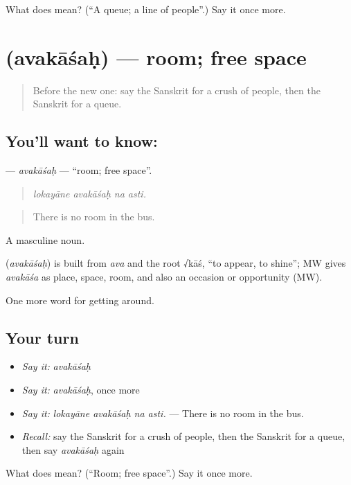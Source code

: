 \begin{tcolorbox}[breakable,colback=teal!4,colframe=teal!35!black,title={Before you move on}]
What does  mean? (\textquotedblleft{}A queue; a line of people\textquotedblright{}.) Say it once more.
\end{tcolorbox}
\section[\texorpdfstring{\sk{अवकाशः} (avakāśaḥ)}{अवकाशः (avakāśaḥ)}]{ (avakāśaḥ) — room; free space}

\label{lesson:SA-C406-avakasah}



\begin{quote}
Before the new one: say the Sanskrit for a crush of people, then the Sanskrit for a queue.
\end{quote}

\subsection*{You'll want to know: }
\textbf{} — \emph{avakāśaḥ} — \textquotedblleft{}room; free space\textquotedblright{}.

\begin{quote}
   
\end{quote}

\begin{quote}
\emph{lokayāne avakāśaḥ na asti.}
\end{quote}

\begin{quote}
There is no room in the bus.
\end{quote}

A masculine noun.

\begin{cousinweb}
\textbf{} (\emph{avakāśaḥ}) is built from \emph{ava} and the root √kāś, \textquotedblleft{}to appear, to shine\textquotedblright{}; MW gives \emph{avakāśa} as place, space, room, and also an occasion or opportunity (MW).
\end{cousinweb}

\begin{grammarlens}[title={What you've built}]
One more word for getting around.
\end{grammarlens}

\subsection*{Your turn}
\begin{itemize}
\raggedright
  \item \emph{Say it:} \emph{avakāśaḥ}
  \item \emph{Say it:} \emph{avakāśaḥ}, once more
  \item \emph{Say it:} \emph{lokayāne avakāśaḥ na asti.} — There is no room in the bus.
  \item \emph{Recall:} say the Sanskrit for a crush of people, then the Sanskrit for a queue, then say \emph{avakāśaḥ} again
\end{itemize}

\begin{tcolorbox}[breakable,colback=teal!4,colframe=teal!35!black,title={Before you move on}]
What does  mean? (\textquotedblleft{}Room; free space\textquotedblright{}.) Say it once more.
\end{tcolorbox}
